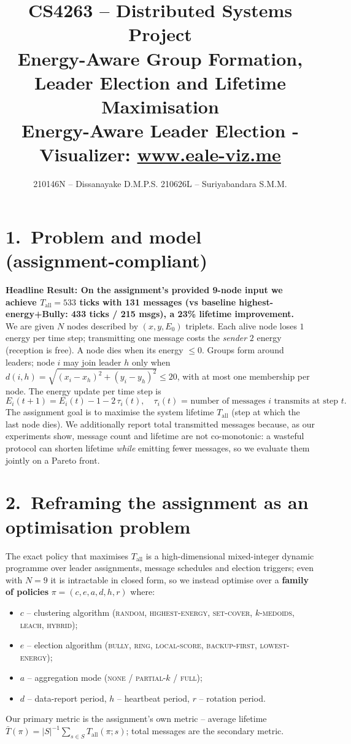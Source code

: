 \documentclass[a4paper,10pt]{article}
\title{\vspace{-2.4em}\textbf{CS4263 -- Distributed Systems Project}\\[2pt]
\large Energy-Aware Group Formation, Leader Election and Lifetime Maximisation\\[4pt]
\normalsize Energy-Aware Leader Election - Visualizer: \url{www.eale-viz.me}}
\author{210146N -- Dissanayake D.M.P.S.\quad\textbar\quad
        210626L -- Suriyabandara S.M.M.}
\date{\vspace{-2.4em}}
\begin{document}
\maketitle

\vspace{-1.2em}
\section*{1.\ Problem and model (assignment-compliant)}
\vspace{-0.4em}
\textbf{Headline Result: On the assignment's provided 9-node input we achieve $T_{\text{all}}=533$ ticks with 131 messages (vs baseline highest-energy+Bully: 433 ticks / 215 msgs), a 23\% lifetime improvement.}\\[4pt]
We are given $N$ nodes described by $(x,y,E_0)$ triplets.
Each alive node loses $1$ energy per time step; transmitting one message
costs the \emph{sender} $2$ energy (reception is free). A node dies when
its energy $\le 0$. Groups form around leaders; node $i$ may join leader
$h$ only when $d(i,h)=\sqrt{(x_i-x_h)^2+(y_i-y_h)^2}\le 20$, with at most
one membership per node.  The energy update per time step is
\[
E_i(t{+}1)=E_i(t)-1-2\,\tau_i(t),\quad
\text{$\tau_i(t)$ = number of messages $i$ transmits at step $t$.}
\]
The assignment goal is to maximise the system lifetime
$T_{\text{all}}$ (step at which the last node dies). We additionally
report total transmitted messages because, as our experiments show,
message count and lifetime are not co-monotonic: a wasteful protocol
can shorten lifetime \emph{while} emitting fewer messages, so we
evaluate them jointly on a Pareto front.

\vspace{-0.6em}
\section*{2.\ Reframing the assignment as an optimisation problem}
\vspace{-0.4em}
The exact policy that maximises $T_{\text{all}}$ is a high-dimensional
mixed-integer dynamic programme over leader assignments, message
schedules and election triggers; even with $N=9$ it is intractable in
closed form, so we instead optimise over a \textbf{family of policies}
$\pi=(c,e,a,d,h,r)$ where:
\begin{itemize}
\item $c$ -- clustering algorithm
(\textsc{random, highest-energy, set-cover, $k$-medoids, leach, hybrid});
\item $e$ -- election algorithm (\textsc{bully, ring, local-score, backup-first, lowest-energy});
\item $a$ -- aggregation mode (\textsc{none / partial-$k$ / full});
\item $d$ -- data-report period, $h$ -- heartbeat period, $r$ -- rotation period.
\end{itemize}
Our primary metric is the assignment's own metric -- average lifetime
$\bar T(\pi)=|S|^{-1}\sum_{s\in S}T_{\text{all}}(\pi;s)$;
total messages are the secondary metric.
\end{document}

